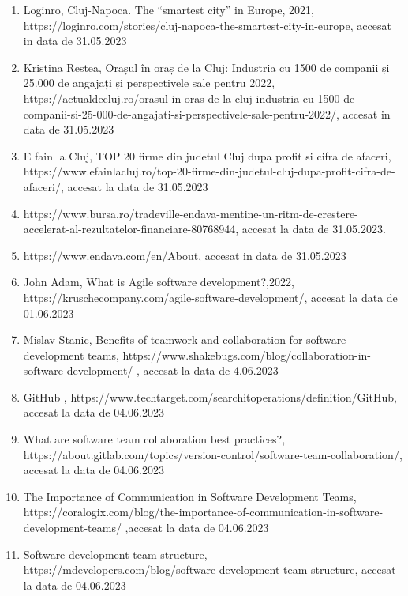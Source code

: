 \documentclass[a4paper, 12pt]{article}
\begin{document}
\begin{enumerate}[1.]
	\item Loginro, Cluj-Napoca. The “smartest city” in Europe, 2021, https://loginro.com/stories/cluj-napoca-the-smartest-city-in-europe, accesat in data de 31.05.2023

	\item Kristina Restea, Orașul în oraș de la Cluj: Industria cu 1500 de companii și 25.000 de angajați și perspectivele sale pentru 2022, https://actualdecluj.ro/orasul-in-oras-de-la-cluj-industria-cu-1500-de-companii-si-25-000-de-angajati-si-perspectivele-sale-pentru-2022/, accesat in data de 31.05.2023

	\item E fain la Cluj, TOP 20 firme din judetul Cluj dupa profit si cifra de afaceri, https://www.efainlacluj.ro/top-20-firme-din-judetul-cluj-dupa-profit-cifra-de-afaceri/, accesat la data de 31.05.2023

	\item  https://www.bursa.ro/tradeville-endava-mentine-un-ritm-de-crestere-accelerat-al-rezultatelor-financiare-80768944, accesat la data de 31.05.2023.

	\item https://www.endava.com/en/About, accesat in data de 31.05.2023

	\item John Adam, What is Agile software development?,2022, https://kruschecompany.com/agile-software-development/, accesat la data de 01.06.2023

	\item Mislav Stanic, Benefits of teamwork and collaboration for software development teams, https://www.shakebugs.com/blog/collaboration-in-software-development/ , accesat la data de 4.06.2023

	\item GitHub , https://www.techtarget.com/searchitoperations/definition/GitHub, accesat la data de 04.06.2023

	\item What are software team collaboration best practices?, https://about.gitlab.com/topics/version-control/software-team-collaboration/, accesat la data de 04.06.2023

	\item The Importance of Communication in Software Development Teams, https://coralogix.com/blog/the-importance-of-communication-in-software-development-teams/ ,accesat la data de 04.06.2023

	\item Software development team structure, https://mdevelopers.com/blog/software-development-team-structure, accesat la data de 04.06.2023


\end{enumerate}
\end{document}
